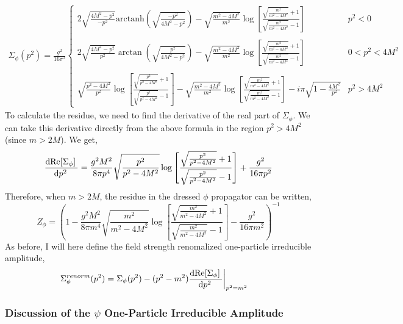 \documentclass{article}
\begin{document}
\begin{align*}
\Sigma_\phi(p^2) =
\frac{g^2}{16 \pi^2}
\begin{cases}
2 \sqrt{\frac{4 M^2 - p^2}{-p^2}} \mathrm{arctanh}{\left(\sqrt{\frac{-p^2}{4 M^2 - p^2}}\right)} - \sqrt{\frac{m^2 - 4 M^2}{m^2}} \log{\left[ \frac{\sqrt{\frac{m^2}{m^2 - 4 M^2}} + 1}{\sqrt{\frac{m^2}{m^2 - 4 M^2}} - 1} \right]} 
& p^2 < 0
\\
&
\\
2 \sqrt{\frac{4 M^2 - p^2}{p^2}} \arctan{\left( \sqrt{\frac{p^2}{4 M^2 - p^2}} \right)} - \sqrt{\frac{m^2 - 4 M^2}{m^2}} \log{\left[ \frac{\sqrt{\frac{m^2}{m^2 - 4 M^2}} + 1}{\sqrt{\frac{m^2}{m^2 - 4 M^2}} - 1} \right]}
& 0 < p^2 < 4 M^2 
\\
&
\\
\sqrt{\frac{p^2 - 4 M^2}{p^2}} \log{\left[ \frac{\sqrt{\frac{p^2}{p^2 - 4 M^2}} + 1}{\sqrt{\frac{p^2}{p^2 - 4 M^2}} - 1} \right]} 
- \sqrt{\frac{m^2 - 4 M^2}{m^2}} \log{\left[ \frac{\sqrt{\frac{m^2}{m^2 - 4 M^2}} + 1}{\sqrt{\frac{m^2}{m^2 - 4 M^2}} - 1} \right]} - i\pi \sqrt{1 - \frac{4 M^2}{p^2}}
& p^2 > 4 M^2
\end{cases}
\end{align*}
To calculate the residue, we need to find the derivative of the real part of $\Sigma_\phi$. We can take this derivative directly from the above formula in the region $p^2 > 4 M^2$ (since $m > 2 M$). We get,
\[ \frac{\mathrm{d}\mathrm{Re}[\Sigma_\phi] \:}{\mathrm{d}p^2 \:} = \frac{g^2 M^2}{8 \pi p^4} \sqrt{\frac{p^2}{p^2-4 M^2}} \log{\left[\frac{\sqrt{\frac{p^2}{p^2-4
   M^2}}+1}{\sqrt{\frac{p^2}{p^2-4 M^2}}-1}\right]} + \frac{g^2}{16 \pi p^2}  \]
Therefore, when $m > 2 M$, the residue in the dressed $\phi$ propagator can be written,
\[ Z_\phi = \left( 1 - \frac{g^2 M^2}{8 \pi m^4} \sqrt{\frac{m^2}{m^2-4 M^2}} \log{ \left[\frac{\sqrt{\frac{m^2}{m^2-4
   M^2}}+1}{\sqrt{\frac{m^2}{m^2-4 M^2}}-1}\right]} - \frac{g^2}{16 \pi m^2}  \right)^{-1} \]
As before, I will here define the field strength renomalized one-particle irreducible amplitude,
\begin{align*}
\Sigma_\phi^{renorm}(p^2) & = \Sigma_\phi(p^2) - (p^2 - m^2) \frac{\mathrm{d}\mathrm{Re}[\Sigma_\phi] \:}{\mathrm{d}p^2 \:} \bigg|_{p^2 = m^2} 
\end{align*}

\subsubsection{Discussion of the $\psi$ One-Particle Irreducible Amplitude}
\end{document}

